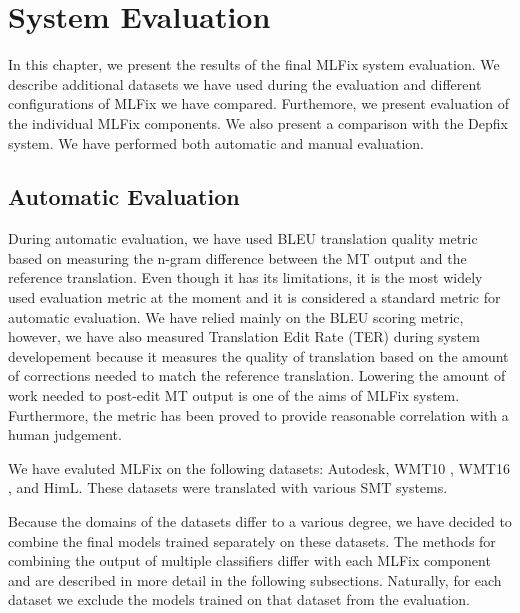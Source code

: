 \chapter{System Evaluation}
\label{chap:eval}

In this chapter, we present the results of the final MLFix system evaluation.
We describe additional datasets we have used during the evaluation and different
configurations of MLFix we have compared. Furthemore, we present evaluation
of the individual MLFix components.
We also present a comparison with the Depfix
system. We have performed both automatic and manual evaluation.

\section{Automatic Evaluation}

During automatic evaluation, we have used BLEU \citep{papineni:2002} translation
quality metric based on measuring the n-gram difference between the MT output
and the reference translation.
Even though it has its limitations, it is the most widely used
evaluation metric at the moment and it is considered a standard metric for automatic evaluation.
We have relied mainly on the BLEU scoring metric, however, we have 
also measured Translation Edit Rate (TER) \citep{Snover06astudy} during system developement because it measures
the quality of translation based on the amount of corrections needed to match
the reference translation. Lowering the amount of work needed to post-edit MT output
is one of the aims of MLFix system. Furthermore, the metric has been proved to provide
reasonable correlation with a human judgement.

We have evaluted MLFix on the following datasets: Autodesk, WMT10\linebreak
\citep{callisonburch-EtAl:2010:WMT}, WMT16 \citep{bojar-EtAl:2016:WMT1}, and HimL.
These datasets
were translated with various SMT systems.

Because the domains of the datasets differ to a various degree,
we have decided to combine the final models trained separately
on these datasets. The methods for combining the output of multiple classifiers
differ with each MLFix component and are described in more detail in the following
subsections.
Naturally, for each dataset we exclude the models trained on that dataset from
the evaluation.


